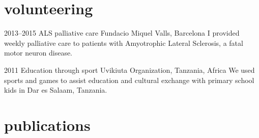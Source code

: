 \documentclass[]{friggeri-cv} %
\begin{document}

\section{volunteering}

\begin{entrylist}


\entry
{2013--2015}
{ALS palliative care}
{Fundacio Miquel Valls, Barcelona}
{I provided weekly palliative care to patients with Amyotrophic
  Lateral Sclerosis, a fatal motor neuron disease.}


\entry
{2011}
{Education through sport}
{Uvikiuta Organization, Tanzania, Africa}
{We used sports and games to assist education and cultural exchange with
  primary school kids in Dar es Salaam, Tanzania.}


\end{entrylist}


\section{publications}


\begin{refsection} 
\nocite{*}
\printbibliography[sorting=chronological, type=inproceedings,
  title={Conference papers}, heading=subbibnumbered]
\end{refsection}



\end{document}
